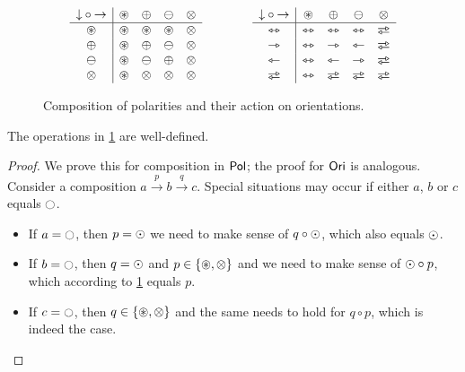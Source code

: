 \documentclass[a4paper]{memoir}
\begin{document}
\begin{figure}[htb]
	\[
		\begin{array}{c | c c c c}
			{\downarrow} \circ {\rightarrow} &
			          \isopol & \pospol & \negpol & \mixpol
			        \\ \hline
			\isopol & \isopol & \isopol & \isopol & \mixpol
			        \\
			\pospol & \isopol & \pospol & \negpol & \mixpol
			        \\
			\negpol & \isopol & \negpol & \pospol & \mixpol
			        \\
			\mixpol & \isopol & \mixpol & \mixpol & \mixpol
			        \\
		\end{array}
		\qquad \qquad
		\begin{array}{c | c c c c}
			{\downarrow} \circ {\rightarrow} &
			          \isopol & \pospol & \negpol & \mixpol
			        \\ \hline
			\equijetsym & \equijetsym & \equijetsym & \equijetsym & \infrajetsym
			        \\
			\jetsym & \equijetsym & \jetsym & \tejsym & \infrajetsym
			        \\
			\tejsym & \equijetsym & \tejsym & \jetsym & \infrajetsym
			        \\
			\infrajetsym & \equijetsym & \infrajetsym & \infrajetsym & \infrajetsym
			        \\
		\end{array}
	\]
	\caption{Composition of polarities and their action on orientations.}
	\label{fig:polarity-orientation}
\end{figure}
\begin{lemma}
	The operations in \cref{fig:polarity-orientation} are well-defined.
\end{lemma}
\begin{proof}
	We prove this for composition in ${\mathsf{Pol}}$; the proof for ${\mathsf{Ori}}$ is analogous.
	Consider a composition $a \xrightarrow{p} b \xrightarrow{q} c$.
	Special situations may occur if either $a$, $b$ or $c$ equals $\npolar$.
	\begin{itemize}
		\item If $a = \npolar$, then $p = {\odot}$ we need to make sense of $q \circ {\odot}$, which also equals ${\odot}$.
		\item If $b = \npolar$, then $q = {\odot}$ and $p \in \mathopen{}\left\{ {\oast}, {\otimes} \right\}\mathclose{}$ and we need to make sense of ${\odot} \circ p$, which according to \cref{fig:polarity-orientation} equals $p$.
		\item If $c = \npolar$, then $q \in \mathopen{}\left\{ {\oast}, {\otimes} \right\}\mathclose{}$ and the same needs to hold for $q \circ p$, which is indeed the case. \qedhere
	\end{itemize}
\end{proof}
\end{document}
